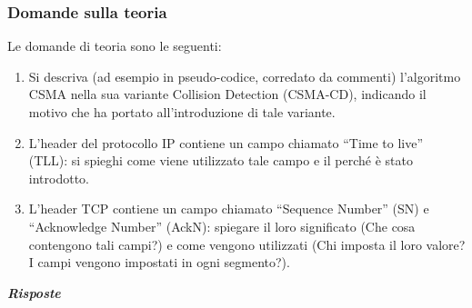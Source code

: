 \documentclass[a4paper]{article}
\newcommand{\dquotes}[1]{``#1''}
\begin{document}
	\subsubsection{Domande sulla teoria}
	Le domande di teoria sono le seguenti:
	\begin{enumerate}
		\item Si descriva (ad esempio in pseudo-codice, corredato da commenti) l'algoritmo CSMA nella sua variante Collision Detection (CSMA-CD), indicando il motivo che ha portato all'introduzione di tale variante.
		
		\item L'header del protocollo IP contiene un campo chiamato \dquotes{Time to live} (TLL): si spieghi come viene utilizzato tale campo e il perché è stato introdotto.
		
		\item L'header TCP contiene un campo chiamato \dquotes{Sequence Number} (SN) e \dquotes{Acknowledge Number} (AckN): spiegare il loro significato (Che cosa contengono tali campi?) e come vengono utilizzati (Chi imposta il loro valore? I campi vengono impostati in ogni segmento?).
	\end{enumerate}
	\textcolor{Green4}{\textbf{\emph{Risposte}}}
\end{document}
